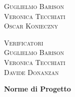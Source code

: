 \documentclass[8pt]{article}
\begin{document}
\begin{titlepage}
\begin{minipage}[t]{0.47\textwidth}
{ {\large{\textsc{Guglielmo Barison\\}}}
    {\large{\textsc{Veronica Tecchiati}\\}}
   {\large{\textsc{Oscar Konieczny\\}}}
    }
  \vspace{8mm}
  
  {\large{\textsc{Verificatori}}
   \vspace{3mm}
   {\\\large{\textsc{Guglielmo Barison}\\}}
   {\large{\textsc{Veronica Tecchiati}\\}} 
   {\large{\textsc{Davide Donanzan}\\}}

  }
  \vspace{3mm}
 \end{minipage}


    \vspace{4cm}
	  \begin{center}
		\begin{flushright}
			{\fontsize{30pt}{52pt}\selectfont \textbf{Norme di Progetto\\}} %
		\end{flushright}
		\vspace{3cm}
	\end{center}
	\vspace{8.3cm}
    {\small \textsc{\href{mailto:
    nan1fyteam.unipd@gmail.com}{\color{black}{nan1fyteam.unipd@gmail.com}}}}
\end{titlepage}
\pagestyle{mystyle}
\end{document}
